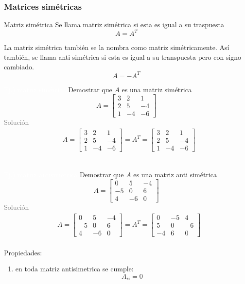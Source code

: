 \subsubsection{Matrices simétricas}
\begin{Theorem*} {Matriz simétrica}
	Se llama matriz simétrica si esta es igual a su traspuesta
	$$ A=A^T $$
\end{Theorem*}
La matriz simétrica también se la nombra como matriz simétricamente. Así también, se llama anti simétrica si esta es igual a su transpuesta pero con signo cambiado.
$$ A=-A^T $$
\addtocounter{exr}{1} 
\colorbox{gray!55}{\textcolor{white}{Ej.) matriz simétrica}}
	Demostrar que $A$ es una matriz simétrica
	$$ A=\begin{bmatrix}
		3 & 2 & 1 \\
		2 & 5 & -4 \\
		1 & -4 & -6
	\end{bmatrix} $$
\textcolor{gray}{Solución }
	\begin{align*}
		&A=\begin{bmatrix}
			3 & 2 & 1 \\
			2 & 5 & -4 \\
			1 & -4 & -6
		\end{bmatrix}=A^T=\begin{bmatrix}
		3 & 2 & 1 \\
		2 & 5 & -4 \\
		1 & -4 & -6
		\end{bmatrix}
	\end{align*}
\hspace*{\fill}\colorbox{gray!55}{ } \\
\addtocounter{exr}{1} 
\colorbox{gray!55}{\textcolor{white}{Ej.) matriz antisimétrica}}
	Demostrar que $A$ es una matriz anti simétrica
	$$ A=\begin{bmatrix}
		0 & 5 & -4 \\
		-5 & 0 & 6 \\
		4 & -6 & 0
	\end{bmatrix} $$
\textcolor{gray}{Solución }
	\begin{align*}
		&A=\begin{bmatrix}
			0 & 5 & -4 \\
			-5 & 0 & 6 \\
			4 & -6 & 0
		\end{bmatrix}=A^T=\begin{bmatrix}
			0 & -5 & 4 \\
			5 & 0 & -6 \\
			-4 & 6 & 0
		\end{bmatrix}
	\end{align*}
\hspace*{\fill}\colorbox{gray!55}{ } \\
Propiedades:
\begin{enumerate}
	\item en toda matriz antisimetrica se cumple:
	$$ A_{ii} = 0 $$
\end{enumerate}
